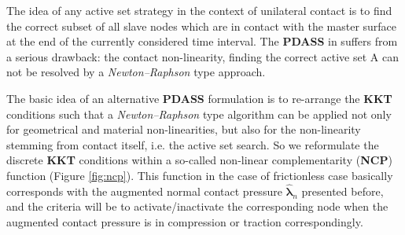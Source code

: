 \documentclass[a4paper,10pt]{article} %
\begin{document}
The idea of any active set strategy in the context of unilateral contact is to find the correct subset of all slave nodes which are in contact with the master surface at the end of the currently considered time interval. The \textbf{PDASS} in  suffers from a serious drawback: the contact non-linearity, finding the correct active set A can not be resolved by a \textit{Newton–Raphson} type approach. 

The basic idea of an alternative \textbf{PDASS} formulation is to re-arrange the \textbf{KKT} conditions such that a \textit{Newton–Raphson} type algorithm can be applied not only for geometrical and material non-linearities, but also for the non-linearity stemming from contact itself, i.e. the active set search. So we reformulate the discrete \textbf{KKT} conditions within a so-called non-linear complementarity (\textbf{NCP}) function (Figure \ref{fig:ncp}). This function in the case of frictionless case basically corresponds with the augmented normal contact pressure $\hat{\boldsymbol{\lambda}}_n$ presented before, and the criteria will be to activate/inactivate the corresponding node when the augmented contact pressure is in compression or traction correspondingly. 
\end{document}
